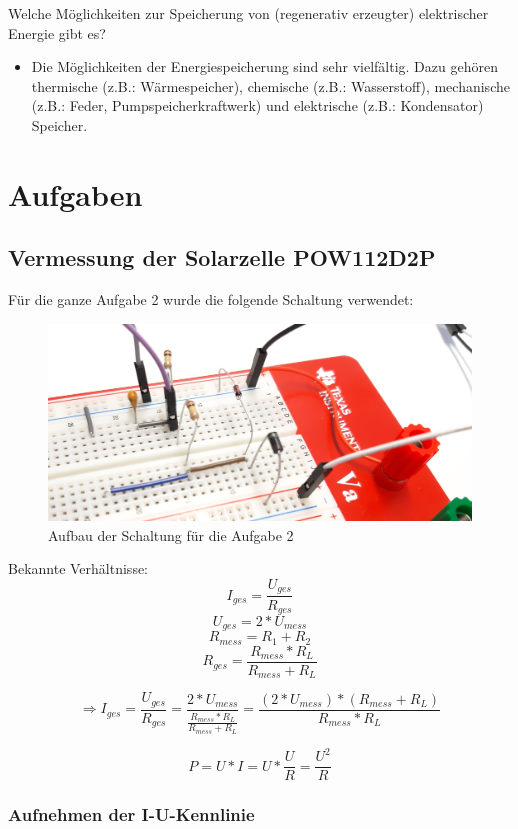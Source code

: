 Welche Möglichkeiten zur Speicherung von (regenerativ erzeugter) elektrischer Energie gibt es?
\begin{itemize}
\item Die Möglichkeiten der Energiespeicherung sind sehr vielfältig. Dazu gehören thermische (z.B.: Wärmespeicher), chemische (z.B.: Wasserstoff), mechanische (z.B.: Feder, Pumpspeicherkraftwerk) und elektrische (z.B.: Kondensator) Speicher.
\end{itemize}

\clearpage
\section{Aufgaben}

\subsection{Vermessung der Solarzelle POW112D2P}

Für die ganze Aufgabe 2 wurde die folgende Schaltung verwendet:

\begin{figure}[htb]
\centering
\includegraphics[width=16cm]{pictures/Dokumentation/Schaltung-1.jpg}
\caption{Aufbau der Schaltung für die Aufgabe 2}
\label{fig:Schaltung2}
\end{figure}

Bekannte Verhältnisse:
\[
I_{ges} = \frac{U_{ges}}{R_{ges}}
\]
\[
U_{ges} = 2 * U_{mess}
\]
\[
R_{mess} = R_{1} + R_{2}
\]
\[R_{ges} = \frac{R_{mess} * R_{L}}{R_{mess} + R_{L}}\]

\[
\Rightarrow I_{ges} = \frac{U_{ges}}{R_{ges}} = \frac{2 * U_{mess}}{\frac{R_{mess} * R_{L}}{R_{mess} + R_{L}}} = \frac{(2 * U_{mess}) * (R_{mess} + R_{L})}{R_{mess} * R_{L}}
\]

\[P = U * I = U * \frac{U}{R} = \frac{U^2}{R}\]

\clearpage
\subsubsection{Aufnehmen der I-U-Kennlinie}

